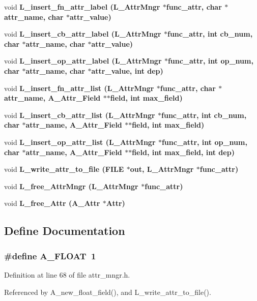 \begin{CompactItemize}
\item 
void \bf{L\_\-insert\_\-fn\_\-attr\_\-label} (\bf{L\_\-Attr\-Mngr} $\ast$func\_\-attr, char $\ast$attr\_\-name, char $\ast$attr\_\-value)
\item 
void \bf{L\_\-insert\_\-cb\_\-attr\_\-label} (\bf{L\_\-Attr\-Mngr} $\ast$func\_\-attr, int cb\_\-num, char $\ast$attr\_\-name, char $\ast$attr\_\-value)
\item 
void \bf{L\_\-insert\_\-op\_\-attr\_\-label} (\bf{L\_\-Attr\-Mngr} $\ast$func\_\-attr, int op\_\-num, char $\ast$attr\_\-name, char $\ast$attr\_\-value, int dep)
\item 
void \bf{L\_\-insert\_\-fn\_\-attr\_\-list} (\bf{L\_\-Attr\-Mngr} $\ast$func\_\-attr, char $\ast$attr\_\-name, \bf{A\_\-Attr\_\-Field} $\ast$$\ast$field, int max\_\-field)
\item 
void \bf{L\_\-insert\_\-cb\_\-attr\_\-list} (\bf{L\_\-Attr\-Mngr} $\ast$func\_\-attr, int cb\_\-num, char $\ast$attr\_\-name, \bf{A\_\-Attr\_\-Field} $\ast$$\ast$field, int max\_\-field)
\item 
void \bf{L\_\-insert\_\-op\_\-attr\_\-list} (\bf{L\_\-Attr\-Mngr} $\ast$func\_\-attr, int op\_\-num, char $\ast$attr\_\-name, \bf{A\_\-Attr\_\-Field} $\ast$$\ast$field, int max\_\-field, int dep)
\item 
void \bf{L\_\-write\_\-attr\_\-to\_\-file} (FILE $\ast$out, \bf{L\_\-Attr\-Mngr} $\ast$func\_\-attr)
\item 
void \bf{L\_\-free\_\-Attr\-Mngr} (\bf{L\_\-Attr\-Mngr} $\ast$func\_\-attr)
\item 
void \bf{L\_\-free\_\-Attr} (\bf{A\_\-Attr} $\ast$Attr)
\end{CompactItemize}


\subsection{Define Documentation}
\subsubsection{\setlength{\rightskip}{0pt plus 5cm}\#define A\_\-FLOAT~1}\label{attr__mngr_8h_91692b1aad25649a053ac2de98cb63d7}




Definition at line 68 of file attr\_\-mngr.h.

Referenced by A\_\-new\_\-float\_\-field(), and L\_\-write\_\-attr\_\-to\_\-file().
